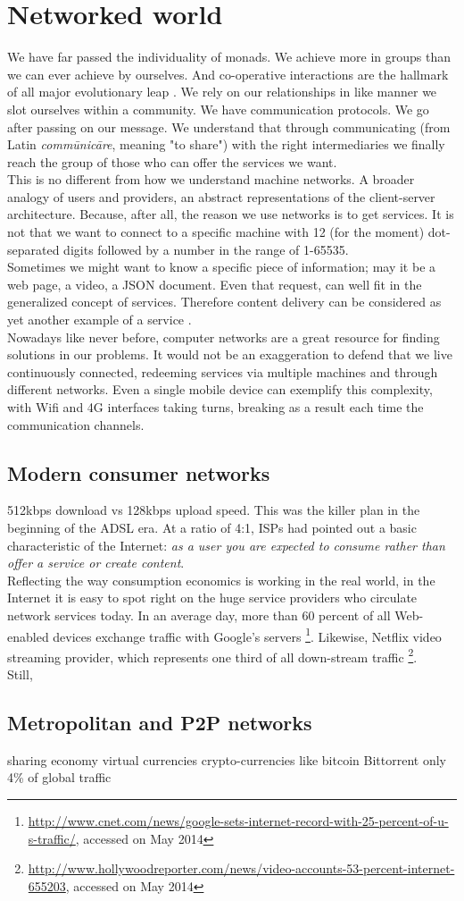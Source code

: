 \newpage
\section{Networked world}
We have far passed the individuality of monads.
We achieve more in groups than we can ever achieve by ourselves.
And co-operative interactions are the hallmark of all major evolutionary leap \cite{Christakis2011}.
We rely on our relationships in like manner we slot ourselves within a community.
We have communication protocols.
We go after passing on our message.
We understand that through communicating (from Latin \emph{comm\={u}nic\={a}re}, meaning "to share") with the right intermediaries we finally reach the group of those who can offer the services we want.
\\ \indent This is no different from how we understand machine networks.
A broader analogy of users and providers, an abstract representations of the client-server architecture.
Because, after all, the reason we use networks is to get services.
It is not that we want to connect to a specific machine with 12 (for the moment) dot-separated digits followed by a number in the range of 1-65535.
\\ \indent Sometimes we might want to know a specific piece of information; may it be a web page, a video, a JSON document.
Even that request, can well fit in the generalized concept of services.
Therefore content delivery can be considered as yet another example of a service \cite{Braun2011}.
\\ \indent Nowadays like never before, computer networks are a great resource for finding solutions in our problems.
It would not be an exaggeration to defend that we live continuously connected, redeeming services via multiple machines and through different networks.
Even a single mobile device can exemplify this complexity, with Wifi and 4G interfaces taking turns, breaking as a result each time the communication channels.

\subsection{Modern consumer networks}
512kbps download vs 128kbps upload speed.
This was the killer plan in the beginning of the ADSL era.
At a ratio of 4:1, ISPs  had pointed out a basic characteristic of the Internet: \emph{as a user you are expected to consume rather than offer a service or create content}.
\\ \indent Reflecting the way consumption economics is working in the real world, in the Internet it is easy to spot right on the huge service providers who circulate network services today.
In an average day, more than 60 percent of all Web-enabled devices exchange traffic with Google's servers \footnote{{\url{http://www.cnet.com/news/google-sets-internet-record-with-25-percent-of-u-s-traffic/}, accessed on May 2014}}.
Likewise, Netflix video streaming provider, which represents one third of all down-stream traffic \footnote{\url{http://www.hollywoodreporter.com/news/video-accounts-53-percent-internet-655203}, accessed on May 2014}.
\\ \indent Still, 


\subsection{Metropolitan and P2P networks}
sharing economy 
virtual currencies
crypto-currencies like bitcoin
Bittorrent only 4\% of global traffic